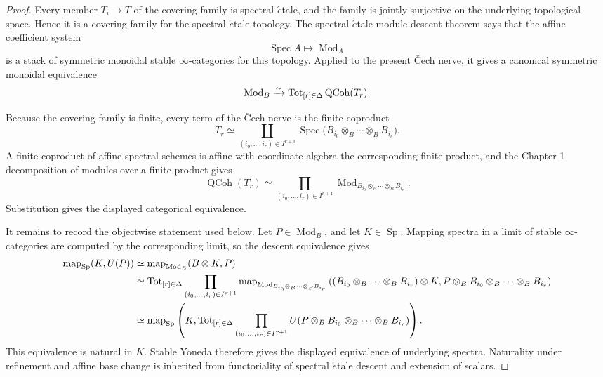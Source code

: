\begin{proof}
Every member \(T_i\to T\) of the covering family is spectral \(\acute{e}\)tale, and the family is jointly surjective on the underlying topological space.  Hence it is a covering family for the spectral \(\acute{e}\)tale topology.  The spectral \(\acute{e}\)tale module-descent theorem says that the affine coefficient system
\[
    \operatorname{Spec}A\longmapsto\operatorname{Mod}_A
\]
is a stack of symmetric monoidal stable \(\infty\)-categories for this topology.  Applied to the present \v{C}ech nerve, it gives a canonical symmetric monoidal equivalence
\[
    \operatorname{Mod}_B
    \xrightarrow{\sim}
    \operatorname{Tot}_{[r]\in\Delta}\operatorname{QCoh}(T_r).
\]

Because the covering family is finite, every term of the \v{C}ech nerve is the finite coproduct
\[
    T_r
    \simeq
    \coprod_{(i_0,\ldots,i_r)\in I^{r+1}}
    \operatorname{Spec}
    \bigl(
      B_{i_0}\otimes_B\cdots\otimes_BB_{i_r}
    \bigr).
\]
A finite coproduct of affine spectral schemes is affine with coordinate algebra the corresponding finite product, and the Chapter 1 decomposition of modules over a finite product gives
\[
    \operatorname{QCoh}(T_r)
    \simeq
    \prod_{(i_0,\ldots,i_r)\in I^{r+1}}
    \operatorname{Mod}_{B_{i_0}\otimes_B\cdots\otimes_BB_{i_r}}.
\]
Substitution gives the displayed categorical equivalence.

It remains to record the objectwise statement used below.  Let \(P\in\operatorname{Mod}_B\), and let \(K\in\operatorname{Sp}\).  Mapping spectra in a limit of stable \(\infty\)-categories are computed by the corresponding limit, so the descent equivalence gives
\[
\begin{aligned}
    \operatorname{map}_{\operatorname{Sp}}(K,U(P))
    &\simeq
    \operatorname{map}_{\operatorname{Mod}_B}(B\otimes K,P)
    \\
    &\simeq
    \operatorname{Tot}_{[r]\in\Delta}
    \prod_{(i_0,\ldots,i_r)\in I^{r+1}}
    \operatorname{map}_{\operatorname{Mod}_{B_{i_0}\otimes_B\cdots\otimes_BB_{i_r}}}
    \left(
      (B_{i_0}\otimes_B\cdots\otimes_BB_{i_r})\otimes K,
      P\otimes_BB_{i_0}\otimes_B\cdots\otimes_BB_{i_r}
    \right)
    \\
    &\simeq
    \operatorname{map}_{\operatorname{Sp}}
    \left(
      K,
      \operatorname{Tot}_{[r]\in\Delta}
      \prod_{(i_0,\ldots,i_r)\in I^{r+1}}
      U\!\left(
        P\otimes_BB_{i_0}\otimes_B\cdots\otimes_BB_{i_r}
      \right)
    \right).
\end{aligned}
\]
This equivalence is natural in \(K\).  Stable Yoneda therefore gives the displayed equivalence of underlying spectra.  Naturality under refinement and affine base change is inherited from functoriality of spectral \(\acute{e}\)tale descent and extension of scalars.
\end{proof}

